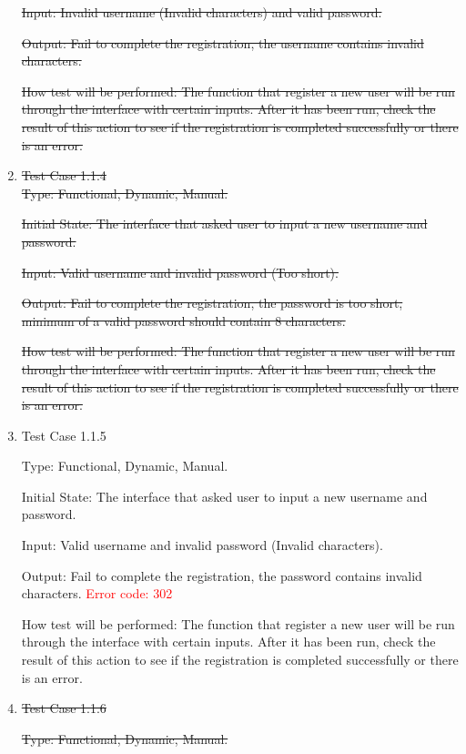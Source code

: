 \documentclass[12pt, titlepage]{article}
\begin{document}
\begin{enumerate}
\st{Input: Invalid username (Invalid characters) and valid password.}
					
\st{Output: Fail to complete the registration, the username contains invalid characters.}
					
\st{How test will be performed: The function that register a new user will be run through the interface with certain inputs. After it has been run, check the result of this action to see if the registration is completed successfully or there is an error.}

\item \st{Test Case 1.1.4}\\ 

\st {Type: Functional, Dynamic, Manual.}
					
\st{Initial State: The interface that asked user to input a new username and password.}
					
\st{Input: Valid username and invalid password (Too short).}
					
\st{Output: Fail to complete the registration, the password is too short, minimum of a valid password should contain 8 characters.}
					
\st{How test will be performed: The function that register a new user will be run through the interface with certain inputs. After it has been run, check the result of this action to see if the registration is completed successfully or there is an error.}

\item{Test Case 1.1.5\\}

Type: Functional, Dynamic, Manual.
					
Initial State: The interface that asked user to input a new username and password.
					
Input: Valid username and invalid password (Invalid characters).
					
Output: Fail to complete the registration, the password contains invalid characters. \textcolor{red}{Error code: 302}
					
How test will be performed: The function that register a new user will be run through the interface with certain inputs. After it has been run, check the result of this action to see if the registration is completed successfully or there is an error.

\item{\st{ Test Case 1.1.6}\\}

\st{Type: Functional, Dynamic, Manual.}
					

\end{enumerate}
\end{document}
